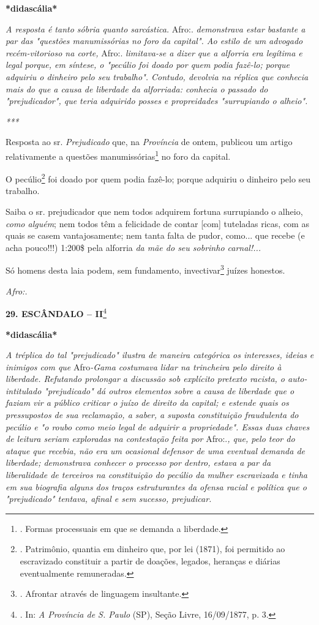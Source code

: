 \textbf{*didascália*}

\emph{A resposta é tanto sóbria quanto sarcástica.} Afro:.
\emph{demonstrava estar bastante a par das "questões manumissórias no
foro da capital". Ao estilo de um advogado recém-vitorioso na corte,}
Afro:. \emph{limitava-se a dizer que a alforria era legítima e legal
porque, em síntese, o "pecúlio foi doado por quem podia fazê-lo; porque
adquiriu o dinheiro pelo seu trabalho". Contudo, devolvia na réplica que
conhecia mais do que a causa de liberdade da alforriada: conhecia o
passado do "prejudicador", que teria adquirido posses e propreidades
"surrupiando o alheio". }

\emph{***}

Resposta ao sr. \emph{Prejudicado} que, na \emph{Província} de ontem,
publicou um artigo relativamente a questões manumissórias\footnote{.
  Formas processuais em que se demanda a liberdade.} no foro da capital.

O pecúlio\footnote{. Patrimônio, quantia em dinheiro que, por lei
  (1871), foi permitido ao escravizado constituir a partir de doações,
  legados, heranças e diárias eventualmente remuneradas.} foi doado por
quem podia fazê-lo; porque adquiriu o dinheiro pelo seu trabalho.

Saiba o sr. prejudicador que nem todos adquirem fortuna surrupiando o
alheio, \emph{como alguém}; nem todos têm a felicidade de contar
{[}com{]} tuteladas ricas, com as quais se casem vantajosamente; nem
tanta falta de pudor, como... que recebe (e acha pouco!!!) 1:200\$ pela
alforria \emph{da mãe do seu sobrinho carnal!...}

Só homens desta laia podem, sem fundamento, invectivar\footnote{.
  Afrontar através de linguagem insultante.}
juíze\protect\hypertarget{Secao_Sem_Titulo-39}{}{}s honestos.

\emph{Afro:.}

\textbf{29. ESCÂNDALO -- II}\footnote{. In: \emph{A Província de S.
  Paulo} (SP), Seção Livre, 16/09/1877, p. 3.}

\textbf{*didascália*}

\emph{A tréplica do tal "prejudicado" ilustra de maneira categórica os
interesses, ideias e inimigos com que} Afro\emph{-Gama costumava lidar
na trincheira pelo direito à liberdade. Refutando prolongar a discussão
sob explícito pretexto racista, o auto-intitulado "prejudicado" dá
outros elementos sobre a causa de liberdade que o faziam vir a público
criticar o juízo de direito da capital; e estende quais os pressupostos
de sua reclamação, a saber, a suposta constituição fraudulenta do
pecúlio e "o roubo como meio legal de adquirir a propriedade". Essas
duas chaves de leitura seriam exploradas na contestação feita por}
Afro:.\emph{, que, pelo teor do ataque que recebia, não era um ocasional
defensor de uma eventual demanda de liberdade; demonstrava conhecer o
processo por dentro, estava a par da liberalidade de terceiros na
constituição do pecúlio da mulher escravizada e tinha em sua biografia
alguns dos traços estruturantes da ofensa racial e política que o
"prejudicado" tentava, afinal e sem sucesso, prejudicar. }

